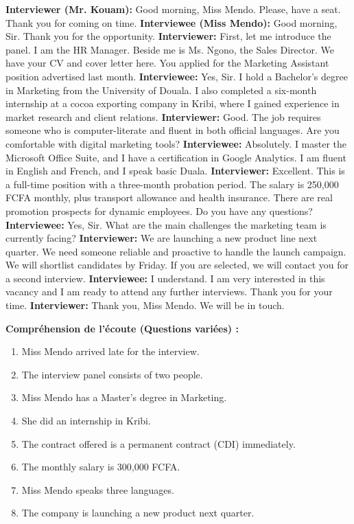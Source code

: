 \documentclass[11pt]{article}
\begin{document}
\begin{textebox}
\textbf{Interviewer (Mr. Kouam):} Good morning, Miss Mendo. Please, have a seat. Thank you for coming on time.
\textbf{Interviewee (Miss Mendo):} Good morning, Sir. Thank you for the opportunity.
\textbf{Interviewer:} First, let me introduce the panel. I am the HR Manager. Beside me is Ms. Ngono, the Sales Director. We have your CV and cover letter here. You applied for the Marketing Assistant position advertised last month.
\textbf{Interviewee:} Yes, Sir. I hold a Bachelor's degree in Marketing from the University of Douala. I also completed a six-month internship at a cocoa exporting company in Kribi, where I gained experience in market research and client relations.
\textbf{Interviewer:} Good. The job requires someone who is computer-literate and fluent in both official languages. Are you comfortable with digital marketing tools?
\textbf{Interviewee:} Absolutely. I master the Microsoft Office Suite, and I have a certification in Google Analytics. I am fluent in English and French, and I speak basic Duala.
\textbf{Interviewer:} Excellent. This is a full-time position with a three-month probation period. The salary is 250,000 FCFA monthly, plus transport allowance and health insurance. There are real promotion prospects for dynamic employees. Do you have any questions?
\textbf{Interviewee:} Yes, Sir. What are the main challenges the marketing team is currently facing?
\textbf{Interviewer:} We are launching a new product line next quarter. We need someone reliable and proactive to handle the launch campaign. We will shortlist candidates by Friday. If you are selected, we will contact you for a second interview.
\textbf{Interviewee:} I understand. I am very interested in this vacancy and I am ready to attend any further interviews. Thank you for your time.
\textbf{Interviewer:} Thank you, Miss Mendo. We will be in touch.
\end{textebox}

\noindent\textbf{Compréhension de l'écoute (Questions variées) :}

\begin{exercice}
\begin{enumerate}
    \item Miss Mendo arrived late for the interview.
    \item The interview panel consists of two people.
    \item Miss Mendo has a Master's degree in Marketing.
    \item She did an internship in Kribi.
    \item The contract offered is a permanent contract (CDI) immediately.
    \item The monthly salary is 300,000 FCFA.
    \item Miss Mendo speaks three languages.
    \item The company is launching a new product next quarter.
\end{enumerate}
\end{exercice}
\end{document}
